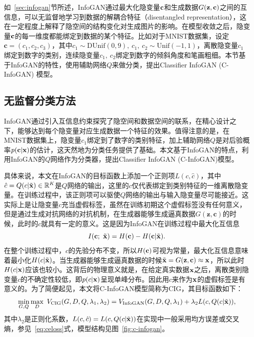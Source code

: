 如~\ref{sec:infogan}节所述，InfoGAN通过最大化隐变量$\mathbf{c}$和生成数据$G(\mathbf{z}, \mathbf{c})$之间的互信息，可以无监督地学习到数据的解耦合特征（disentangled representation），这在一定程度上解释了隐空间的结构变化对生成图片的影响。在模型收敛之后，隐变量$\mathbf{c}$的每一维度都能绑定到数据的某个特征。比如对于MNIST数据集，设定$\mathbf{c} = (c_1, c_2, c_3)$，其中$c_1 \sim \text{DUnif}(0,9), ~c_1,~c_2 \sim \text{Unif}(-1,1)$，离散隐变量$c_1$绑定到数字的类别，连续隐变量$c_1, ~c_2$绑定到数字的倾斜角度和笔画粗细。本节基于InfoGAN的特性，使用辅助网络$Q$来做分类，提出Classifier InfoGAN (C-InfoGAN) 模型。

\subsection{无监督分类方法}
InfoGAN通过引入互信息约束探究了隐空间和数据空间的联系，在精心设计之下，能够达到每个隐变量对应生成数据一个特征的效果。值得注意的是，在MNIST数据集上，隐变量$c_1$绑定到了数字的类别特征，加上辅助网络$Q$是对后验概率$p(\mathbf{c}|\mathbf{x})$的估计，这天然地为分类任务提供了基础。本文基于InfoGAN的特点，利用InfoGAN的$Q$网络作为分类器，提出Classifier InfoGAN (C-InfoGAN)模型。

具体来说，本文在InfoGAN的目标函数上添加一个正则项$L(c,\hat{c})$，其中$\hat{c} = Q(c|\tilde{\mathbf{x}}) \in \mathbb{R}^K$是$Q$网络的输出，这里的$c$仅代表绑定到类别特征的一维离散隐变量。在训练过程中，该正则项可以驱使$Q$网络的输出与输入隐变量尽可能接近。这实际上是让隐变量$c$充当虚假标签，虽然在训练初期这个虚假标签没有任何意义，但是通过生成对抗网络的对抗机制，在生成器能够生成逼真数据$G(\mathbf{z}, \mathbf{c})$的时候，此时的$c$就具有一定的意义。这是因为InfoGAN在训练过程中最大化互信息
\[
  I(\mathbf{c};~\tilde{\mathbf{x}}) = 
    H(\mathbf{c}) - H(\mathbf{c}|\tilde{\mathbf{x}}).
\]
在整个训练过程中，$c$的先验分布不变，所以$H(\mathbf{c})$可视为常量，最大化互信息意味着最小化$H(c|\tilde{\mathbf{x}})$。当生成器能够生成逼真数据的时候$\tilde{\mathbf{x}} = G(\mathbf{z},\mathbf{c}) \approx \mathbf{x}$，所以此时$H(c|\mathbf{x})$应该也较小。这背后的物理意义就是，在给定真实数据$\mathbf{x}$之后，离散类别隐变量$c$的不确定性较低，即$p(c|\mathbf{x})$呈现单峰分布。因此用$c$来作为$\mathbf{x}$的虚假标签是有意义的。为了简便起见，本文将C-InfoGAN模型简称为CIG，其目标函数如下：
\begin{equation}\label{eq:cinfogan-obj}
    \min_{G,Q}\max_D~ V_{\text{CIG}}(G,D,Q,\lambda_1,\lambda_2) = 
    V_{\text{InfoGAN}}(G,D,Q,\lambda_1) + \lambda_2 L(c, Q(c|\tilde{\mathbf{x}})),
\end{equation}
其中$\lambda_2$是正则化系数，$L(c,\hat{c}) = L(c, Q(c|\tilde{\mathbf{x}}))$在实现中一般采用均方误差或交叉熵，参见~\eqref{eq:celoss}式，模型结构见图~\ref{fig:c-infogan}。

